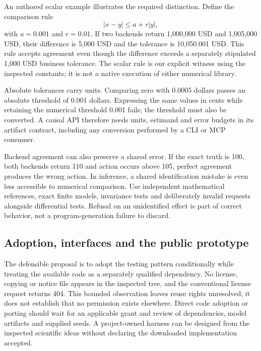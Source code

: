 An authored scalar example illustrates the required distinction. Define the comparison rule
\[
 |x-y|\leq a+r|y|,
\]
with $a=0.001$ and $r=0.01$. If two backends return 1,000,000 USD and 1,005,000 USD, their difference is 5,000 USD and the tolerance is 10,050.001 USD. This rule accepts agreement even though the difference exceeds a separately stipulated 1,000 USD business tolerance. The scalar rule is our explicit witness using the inspected constants; it is not a native execution of either numerical library.\citep{exec24_affordance_fuzzing_reference}

Absolute tolerances carry units. Comparing zero with 0.0005 dollars passes an absolute threshold of 0.001 dollars. Expressing the same values in cents while retaining the numerical threshold 0.001 fails; the threshold must also be converted. A causal API therefore needs units, estimand and error budgets in its artifact contract, including any conversion performed by a CLI or MCP consumer.\citep{exec24_affordance_fuzzing_reference}

Backend agreement can also preserve a shared error. If the exact truth is 100, both backends return 110 and action occurs above 105, perfect agreement produces the wrong action. In inference, a shared identification mistake is even less accessible to numerical comparison. Use independent mathematical references, exact finite models, invariance tests and deliberately invalid requests alongside differential tests. Refusal on an unidentified effect is part of correct behavior, not a program-generation failure to discard.\citep{exec24_affordance_fuzzing_reference}

\subsection{Adoption, interfaces and the public prototype}
The defensible proposal is to adopt the testing pattern conditionally while treating the available code as a separately qualified dependency. No license, copying or notice file appears in the inspected tree, and the conventional license request returns 404. This bounded observation leaves reuse rights unresolved; it does not establish that no permission exists elsewhere. Direct code adoption or porting should wait for an applicable grant and review of dependencies, model artifacts and supplied seeds. A project-owned harness can be designed from the inspected scientific ideas without declaring the downloaded implementation accepted.\citep{exec24_titanfuzz_source,exec24_affordance_fuzzing_reference}

